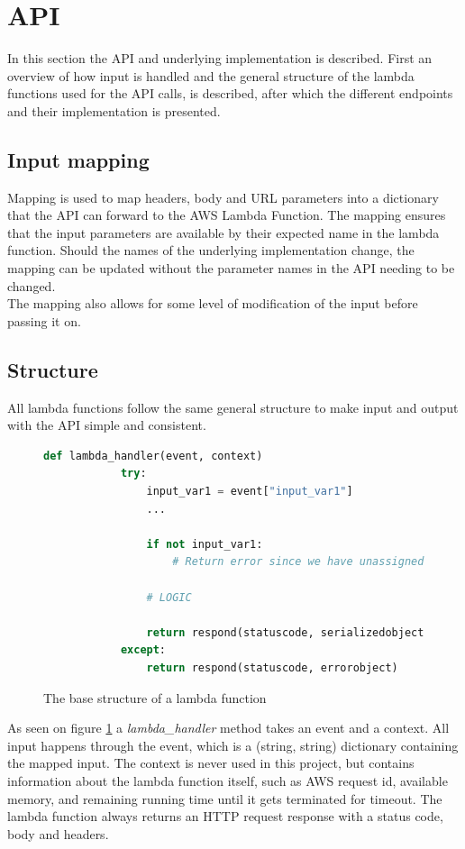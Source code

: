 \section{API}
In this section the API and underlying implementation is described. First an overview of how input is handled and the general structure of the lambda functions used for the API calls, is described, after which the different endpoints and their implementation is presented.

\subsection{Input mapping} \label{api:mapping}
Mapping is used to map headers, body and URL parameters into a dictionary that the API can forward to the AWS Lambda Function. The mapping ensures that the input parameters are available by their expected name in the lambda function. Should the names of the underlying implementation change, the mapping can be updated without the parameter names in the API needing to be changed.\\
The mapping also allows for some level of modification of the input before passing it on.

\subsection{Structure}
All lambda functions follow the same general structure to make input and output with the API simple and consistent.

\begin{figure}[H]
    \centering
    \begin{lstlisting}[language=Python]
        def lambda_handler(event, context)
            try:
                input_var1 = event["input_var1"]
                ...
                
                if not input_var1:
                    # Return error since we have unassigned variables
                    
                # LOGIC
                
                return respond(statuscode, serializedobject)
            except:
                return respond(statuscode, errorobject)
    \end{lstlisting}
    \caption{The base structure of a lambda function}
    \label{fig:samplelambdafunction}
\end{figure}

As seen on figure \ref{fig:samplelambdafunction} a \textit{lambda\_handler} method takes an event and a context. 
All input happens through the event, which is a (string, string) dictionary containing the mapped input. 
The context is never used in this project, but contains information about the lambda function itself, such as AWS request id, available memory, and remaining running time until it gets terminated for timeout.
The lambda function always returns an HTTP request response with a status code, body and headers.


